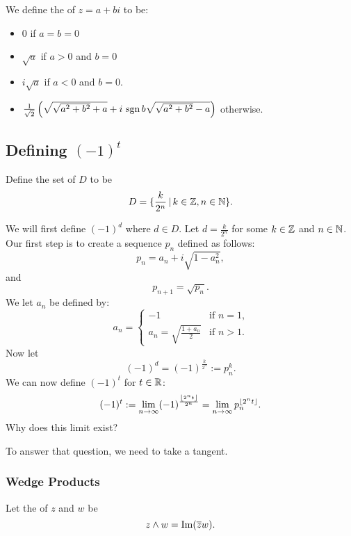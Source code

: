 \begin{definition}
    We define the  of $z = a+bi$ to be:
    \begin{itemize}
        \item $0$ if $a=b=0$
        \item $\sqrt{a}$ if $a>0$ and $b = 0$
        \item $i\sqrt{a}$ if $a < 0$ and $b = 0$.
        \item $\frac{1}{\sqrt{2}}\left( \sqrt{ \sqrt{a^2 + b^2} + a} 
            + i\, \operatorname{sgn}{b} \sqrt{\sqrt{a^2+b^2}-a} \right)$ otherwise. 
    \end{itemize}
\end{definition}


\subsection{Defining $(-1)^t$}

\begin{definition}
    Define the set of  $D$ to be
    \[ D = \{ \frac{k}{2^n} \, | \, k \in \operatorname{\mathbb{Z}}, n \in \operatorname{\mathbb{N}} \}. \]
\end{definition}

We will first define $(-1)^d$ where $d \in D$.
Let $d = \frac{k}{2^n}$ for some $k \in \operatorname{\mathbb{Z}}$ and $n \in \operatorname{\mathbb{N}}$.
Our first step is to create a sequence $p_n$ defined as follows:
\[ p_n = a_n + i \sqrt{1 - a_n^2}, \]
and 
\[ p_{n+1} = \sqrt{p_n}. \]
We let $a_n$ be defined by:
\[ a_n = \begin{cases}
        -1 & \text{if $n = 1$,} \\
        a_n = \sqrt{\frac{1 + a_n}{2}} & \text{if $n > 1$.}
    \end{cases}
\]
Now let
\[ (-1)^d = (-1)^{\frac{k}{2^n}} := p_n^k. \]
We can now define $(-1)^t$ for $t \in \operatorname{\mathbb{R}}$:
\[ (-1)^t := \lim_{n \to \infty} (-1)^{\frac{\left \lfloor{2^nt}\right \rfloor}{2^n}}
    = \lim_{n \to \infty} p_n^{\left \lfloor{2^nt}\right \rfloor}.
\]
Why does this limit exist?

\noindent
To answer that question, we need to take a tangent.

\subsubsection{Wedge Products}

\begin{definition}
    Let the  of $z$ and $w$ be
    \[ z \wedge w = \operatorname{Im} (\overline{z}w). \]
\end{definition}

